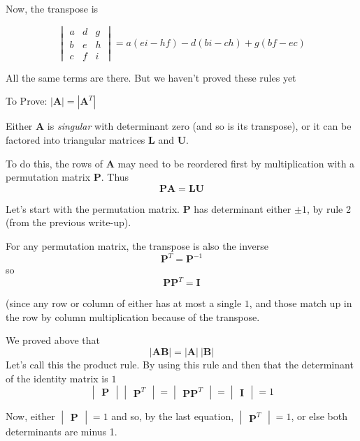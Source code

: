 \documentclass[11pt, oneside]{article}
\begin{document}
Now, the transpose is

\[ 
\begin{vmatrix}
a & d & g \\
b & e & h \\
c & f & i
\end{vmatrix}
=
a(ei - hf) - d(bi - ch) + g(bf - ec) \]

All the same terms are there.  But we haven't proved these rules yet

To Prove:  $|\mathbf{A}| = |\mathbf{A}^T|$

Either $\mathbf{A}$ is \emph{singular} with determinant zero (and so is its transpose), or it can be factored into triangular matrices $\mathbf{L}$ and $\mathbf{U}$.


To do this, the rows of $\mathbf{A}$ may need to be reordered first by multiplication with a permutation matrix $\mathbf{P}$.  Thus
\[ \mathbf{P} \mathbf{A} = \mathbf{L} \mathbf{U} \]

Let's start with the permutation matrix.  $\mathbf{P}$ has determinant either $\pm 1$, by rule 2  (from the previous write-up).  

For any permutation matrix, the transpose is also the inverse
\[ \mathbf{P}^T = \mathbf{P}^{-1} \]
so
\[ \mathbf{P} \mathbf{P}^T = \mathbf{I} \]

(since any row or column of either has at most a single $1$, and those match up in the row by column multiplication because of the transpose.

We proved above that
\[ |\mathbf{AB}| = |\mathbf{A}|\ |\mathbf{B}|  \]
Let's call this the product rule.  By using this rule and then that the determinant of the identity matrix is $1$
\[ 
\begin{vmatrix} \mathbf{P} \end{vmatrix}
\begin{vmatrix} \mathbf{P}^T \end{vmatrix}
=
\begin{vmatrix} \mathbf{P}\mathbf{P}^T \end{vmatrix}
=
\begin{vmatrix} \mathbf{I} \end{vmatrix}
= 1
\]

Now, either $\begin{vmatrix} \mathbf{P} \end{vmatrix} = 1$ and so, by the last equation, $\begin{vmatrix} \mathbf{P}^T \end{vmatrix} = 1$, or else both determinants are minus 1.  
\end{document}
